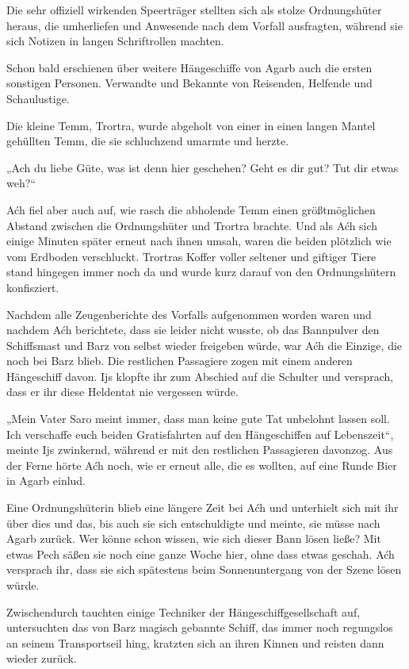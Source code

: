 Die sehr offiziell wirkenden Speerträger stellten sich als stolze Ordnungshüter heraus, die umherliefen und Anwesende nach dem Vorfall ausfragten, während sie sich Notizen in langen Schriftrollen machten.

Schon bald erschienen über weitere Hängeschiffe von Agarb auch die ersten sonstigen Personen. Verwandte und Bekannte von Reisenden, Helfende und Schaulustige.

Die kleine Temm, Trortra, wurde abgeholt von einer in einen langen Mantel gehüllten Temm, die sie schluchzend umarmte und herzte.

„Ach du liebe Güte, was ist denn hier geschehen? Geht es dir gut? Tut dir etwas weh?“

Aćh fiel aber auch auf, wie rasch die abholende Temm einen größtmöglichen Abstand zwischen die Ordnungshüter und Trortra brachte. Und als Aćh sich einige Minuten später erneut nach ihnen umsah, waren die beiden plötzlich wie vom Erdboden verschluckt. Trortras Koffer voller seltener und giftiger Tiere stand hingegen immer noch da und wurde kurz darauf von den Ordnungshütern konfisziert.

Nachdem alle Zeugenberichte des Vorfalls aufgenommen worden waren und nachdem Aćh berichtete, dass sie leider nicht wusste, ob das Bannpulver den Schiffsmast und Barz von selbst wieder freigeben würde, war Aćh die Einzige, die noch bei Barz blieb. Die restlichen Passagiere zogen mit einem anderen Hängeschiff davon. Ijs klopfte ihr zum Abschied auf die Schulter und versprach, dass er ihr diese Heldentat nie vergessen würde.

„Mein Vater Saro meint immer, dass man keine gute Tat unbelohnt lassen soll. Ich verschaffe euch beiden Gratisfahrten auf den Hängeschiffen auf Lebenszeit“, meinte Ijs zwinkernd, während er mit den restlichen Passagieren davonzog. Aus der Ferne hörte Aćh noch, wie er erneut alle, die es wollten, auf eine Runde Bier in Agarb einlud.

Eine Ordnungshüterin blieb eine längere Zeit bei Aćh und unterhielt sich mit ihr über dies und das, bis auch sie sich entschuldigte und meinte, sie müsse nach Agarb zurück. Wer könne schon wissen, wie sich dieser Bann lösen ließe? Mit etwas Pech säßen sie noch eine ganze Woche hier, ohne dass etwas geschah. Aćh versprach ihr, dass sie sich spätestens beim Sonnenuntergang von der Szene lösen würde.

Zwischendurch tauchten einige Techniker der Hängeschiffgesellschaft auf, untersuchten das von Barz magisch gebannte Schiff, das immer noch regungslos an seinem Transportseil hing, kratzten sich an ihren Kinnen und reisten dann wieder zurück.

